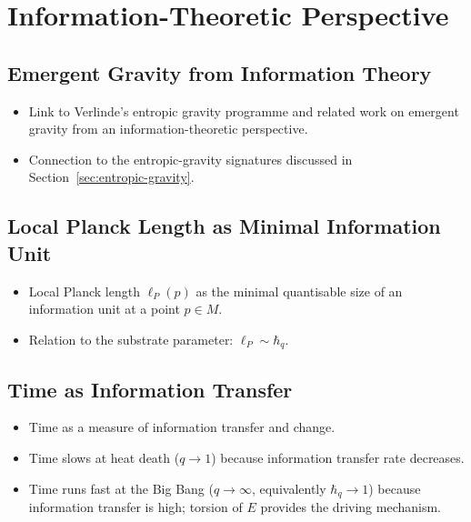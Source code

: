 \chapter{Information-Theoretic Perspective}
\label{chap:information-theory}


\section{Emergent Gravity from Information Theory}
\label{sec:emergent-gravity-info}

\begin{itemize}
  \item Link to Verlinde's entropic gravity programme and related work on
        emergent gravity from an information-theoretic perspective.
  \item Connection to the entropic-gravity signatures discussed in
        Section~\ref{sec:entropic-gravity}.
\end{itemize}


\section{Local Planck Length as Minimal Information Unit}
\label{sec:planck-info-unit}

\begin{itemize}
  \item Local Planck length $\ell_P(p)$ as the minimal quantisable size of an
        information unit at a point $p \in M$.
  \item Relation to the substrate parameter: $\ell_P \sim \hbar_q$.
\end{itemize}


\section{Time as Information Transfer}
\label{sec:time-info}

\begin{itemize}
  \item Time as a measure of information transfer and change.
  \item Time slows at heat death ($q \to 1$) because information transfer
        rate decreases.
  \item Time runs fast at the Big Bang ($q \to \infty$, equivalently $\hbar_q \to 1$) because information
        transfer is high; torsion of $E$ provides the driving mechanism.
\end{itemize}


